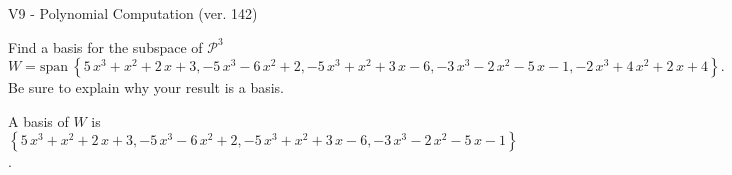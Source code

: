 \begin{exercise}
  \begin{exerciseTitle}V9 - Polynomial Computation (ver. 142)\end{exerciseTitle}
  \begin{exerciseStatement}
    Find a basis for the subspace of \(\mathcal{P}^3\) 
\[W=\mathrm{span}\ \left\{5 \, x^{3} + x^{2} + 2 \, x + 3 , -5 \, x^{3} - 6 \, x^{2} + 2 , -5 \, x^{3} + x^{2} + 3 \, x - 6 , -3 \, x^{3} - 2 \, x^{2} - 5 \, x - 1 , -2 \, x^{3} + 4 \, x^{2} + 2 \, x + 4\right\}.\]
 Be sure to explain why your result is a basis.


  \end{exerciseStatement}
  \begin{exerciseAnswer}
   A basis of \(W\) is  \(\left\{5 \, x^{3} + x^{2} + 2 \, x + 3 , -5 \, x^{3} - 6 \, x^{2} + 2 , -5 \, x^{3} + x^{2} + 3 \, x - 6 , -3 \, x^{3} - 2 \, x^{2} - 5 \, x - 1\right\}\).
  


  \end{exerciseAnswer}
\end{exercise}